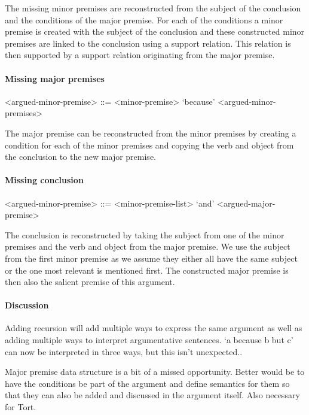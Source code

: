 \noindent The missing minor premises are reconstructed from the subject of the conclusion and the conditions of the major premise. For each of the conditions a minor premise is created with the subject of the conclusion and these constructed minor premises are linked to the conclusion using a support relation. This relation is then supported by a support relation originating from the major premise.

\paragraph{Missing major premises}
\begin{grammar}
<argued-minor-premise> ::= <minor-premise> `because' <argued-minor-premises> %
\end{grammar}

\noindent The major premise can be reconstructed from the minor premises by creating a condition for each of the minor premises and copying the verb and object from the conclusion to the new major premise.

\paragraph{Missing conclusion}
\begin{grammar}
<argued-minor-premise> ::= <minor-premise-list> `and' <argued-major-premise> %
\end{grammar}

\noindent The conclusion is reconstructed by taking the subject from one of the minor premises and the verb and object from the major premise. We use the subject from the first minor premise as we assume they either all have the same subject or the one most relevant is mentioned first. The constructed major premise is then also the salient premise of this argument.

\paragraph{Discussion}
Adding recursion will add multiple ways to express the same argument as well as adding multiple ways to interpret argumentative sentences. `a because b but c' can now be interpreted in three ways, but this isn't unexpected..

Major premise data structure is a bit of a missed opportunity. Better would be to have the conditions be part of the argument and define semantics for them so that they can also be added and discussed in the argument itself. Also necessary for Tort.